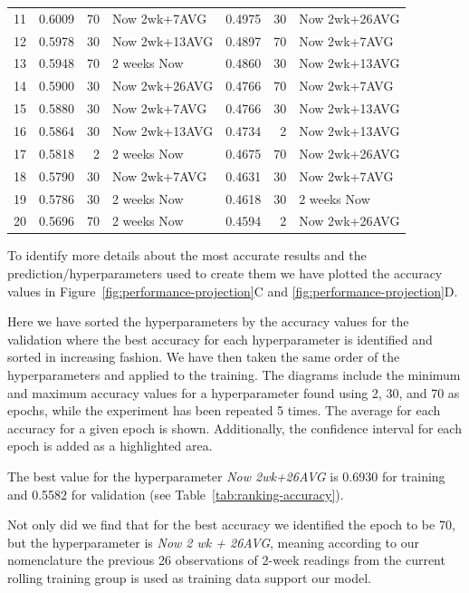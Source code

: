 \documentclass[utf8]{FrontiersinVancouver} %
\begin{document}
\begin{table}[htb]
\begin{center}
{\begin{tabular}{|l||r|r|l|r|r|l|}
11 &  0.6009 &     70 &   Now 2wk+7AVG &  0.4975 &     30 &  Now 2wk+26AVG \\
12 &  0.5978 &     30 &  Now 2wk+13AVG &  0.4897 &     70 &   Now 2wk+7AVG \\
13 &  0.5948 &     70 &    2 weeks Now &  0.4860 &     30 &  Now 2wk+13AVG \\
14 &  0.5900 &     30 &  Now 2wk+26AVG &  0.4766 &     70 &   Now 2wk+7AVG \\
15 &  0.5880 &     30 &   Now 2wk+7AVG &  0.4766 &     30 &  Now 2wk+13AVG \\
16 &  0.5864 &     30 &  Now 2wk+13AVG &  0.4734 &      2 &  Now 2wk+13AVG \\
17 &  0.5818 &      2 &    2 weeks Now &  0.4675 &     70 &  Now 2wk+26AVG \\
18 &  0.5790 &     30 &   Now 2wk+7AVG &  0.4631 &     30 &   Now 2wk+7AVG \\
19 &  0.5786 &     30 &    2 weeks Now &  0.4618 &     30 &    2 weeks Now \\
20 &  0.5696 &     70 &    2 weeks Now &  0.4594 &      2 &  Now 2wk+26AVG \\
\hline
\end{tabular}
}
\end{center}
\end{table}

To identify more details about the most accurate results and the prediction/hyperparameters used to create them we have plotted the accuracy values in Figure~\ref{fig:performance-projection}C and \ref{fig:performance-projection}D. 

Here we have sorted the hyperparameters by the accuracy values for the validation where the best accuracy for each hyperparameter is identified and sorted in increasing fashion. We have then taken the same order of the hyperparameters and applied to the training.
The diagrams include the minimum and maximum accuracy values for a hyperparameter found using 2, 30, and 70 as epochs, while the experiment has been repeated 5 times. The average for each accuracy for a given epoch is shown. Additionally, the confidence interval for each epoch is added as a highlighted area.

The best value for the hyperparameter {\em Now 2wk+26AVG} is 0.6930 for training and 0.5582 for validation (see Table~\ref{tab:ranking-accuracy}).

Not only did we find that for the best accuracy we identified the epoch to be 70, but the hyperparameter is {\em Now 2 wk + 26AVG}, meaning according to our nomenclature the previous 26 observations of 2-week readings from the current rolling training group is used as training data support our model.
\end{document}
